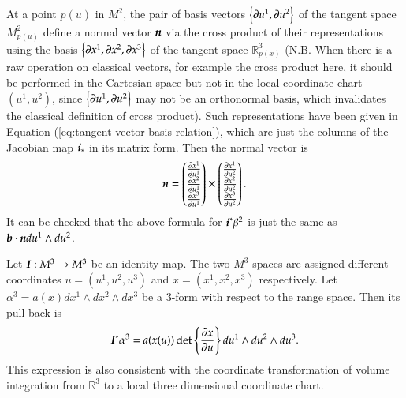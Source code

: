 \documentclass[11pt, a4paper]{book}
\begin{document}
\begin{Example}
  At a point $p(u)$ in $M^2$, the pair of basis vectors
  $\left\{ \boldsymbol{\partial}u^1, \boldsymbol{\partial}u^2 \right\}$ of the tangent space $M_{p(u)}^2$
  define a normal vector $\boldsymbol{n}$ via the cross product of their representations using
  the basis $\left\{ \boldsymbol{\partial}x^1, \boldsymbol{\partial}x^2, \boldsymbol{\partial}x^3 \right\}$ of the
  tangent space $\mathbb{R}_{p(x)}^3$ (N.B. When there is a raw operation on classical
  vectors, for example the cross product here, it should be performed in the Cartesian
  space but not in the local coordinate chart $(u^1,u^2)$, since
  $\left\{ \boldsymbol{\partial}u^1,\boldsymbol{\partial}u^2 \right\}$ may not be an orthonormal basis,
  which invalidates the classical definition of cross product). Such representations have
  been given in Equation (\ref{eq:tangent-vector-basis-relation}), which are just the
  columns of the Jacobian map $\boldsymbol{i}_{*}$ in its matrix form. Then the normal vector is
  \begin{equation*}
    \boldsymbol{n} = \begin{pmatrix}
      \frac{\partial x^1}{\partial u^1} \\ \frac{\partial x^2}{\partial u^1} \\ \frac{\partial
        x^3}{\partial u^1}
    \end{pmatrix}
    \times \begin{pmatrix}
      \frac{\partial x^1}{\partial u^2} \\ \frac{\partial x^2}{\partial u^2} \\ \frac{\partial
        x^3}{\partial u^2}
    \end{pmatrix}.
  \end{equation*}
  It can be checked that the above formula for $\boldsymbol{i}^{*}\beta^2$ is just the same as
  $\boldsymbol{b}\cdot \boldsymbol{n} du^1 \wedge du^2$.
\end{Example}

\begin{Example}
  \label{exam:pullback-of-identity-map}
  Let $\boldsymbol{I}: M^3 \rightarrow M^3$ be an identity map. The two $M^3$ spaces are
  assigned different coordinates $u = (u^1,u^2,u^3)$ and $x = (x^1,x^2,x^3)$ respectively.
  Let $\alpha^3 = a(x) dx^1 \wedge dx^2 \wedge dx^3$ be a 3-form with respect to the range
  space. Then its pull-back is
  \begin{equation*}
    \boldsymbol{I}^{*}\alpha^3 = a(x(u)) \det \left\{ \frac{\partial x}{\partial u} \right\} du^1
    \wedge du^2 \wedge du^3.
  \end{equation*}
  This expression is also consistent with the coordinate transformation of volume
  integration from $\mathbb{R}^3$ to a local three dimensional coordinate chart.
\end{Example}
\end{document}
